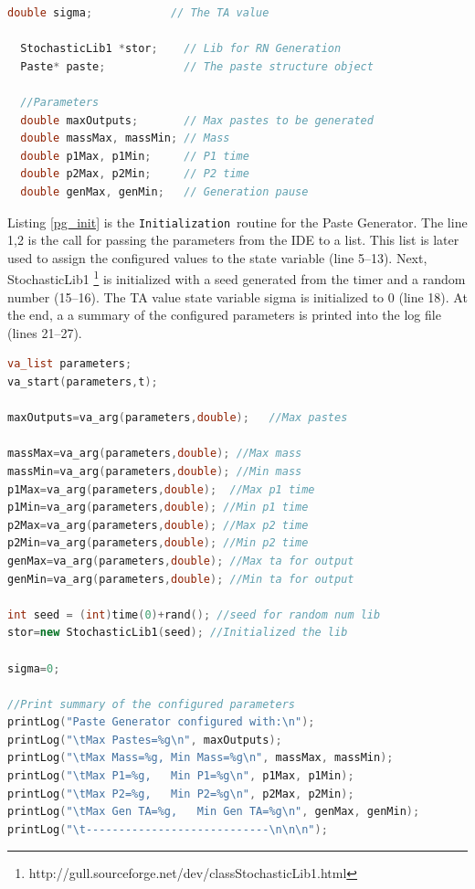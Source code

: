 \documentclass[titlepage]{article}%
\newcommand{\pgen}{\texttt{Paste Generator}~}
\newcommand{\init}{\texttt{Initialization}~}
\begin{document}
{\begin{lstlisting}[caption={State variables and objects}, language=c++, label={pg_state_var}]
  double sigma;            // The TA value

  StochasticLib1 *stor;    // Lib for RN Generation
  Paste* paste;            // The paste structure object

  //Parameters
  double maxOutputs;       // Max pastes to be generated
  double massMax, massMin; // Mass
  double p1Max, p1Min;     // P1 time 
  double p2Max, p2Min;     // P2 time
  double genMax, genMin;   // Generation pause

\end{lstlisting}

Listing \ref{pg_init} is the \init routine for the Paste Generator. The line 1,2 is the call for passing the parameters from the IDE to a list. This list is later used to assign the configured values to the state variable (line 5--13). Next,  StochasticLib1 \footnote{http://gull.sourceforge.net/dev/classStochasticLib1.html} is initialized with a seed generated from the timer and a random number (15--16). The TA value state variable sigma is initialized to 0 (line 18). At the end, a a summary of the configured parameters is printed into the log file (lines 21--27).

\begin{lstlisting}[caption={The \init for the \pgen }, language=c++, label={pg_init}]
va_list parameters;
va_start(parameters,t);

maxOutputs=va_arg(parameters,double);	//Max pastes

massMax=va_arg(parameters,double); //Max mass
massMin=va_arg(parameters,double); //Min mass
p1Max=va_arg(parameters,double);  //Max p1 time
p1Min=va_arg(parameters,double); //Min p1 time
p2Max=va_arg(parameters,double); //Max p2 time
p2Min=va_arg(parameters,double); //Min p2 time
genMax=va_arg(parameters,double); //Max ta for output
genMin=va_arg(parameters,double); //Min ta for output

int seed = (int)time(0)+rand(); //seed for random num lib
stor=new StochasticLib1(seed); //Initialized the lib

sigma=0;												

//Print summary of the configured parameters
printLog("Paste Generator configured with:\n");
printLog("\tMax Pastes=%g\n", maxOutputs);
printLog("\tMax Mass=%g, Min Mass=%g\n", massMax, massMin);
printLog("\tMax P1=%g,   Min P1=%g\n", p1Max, p1Min);
printLog("\tMax P2=%g,   Min P2=%g\n", p2Max, p2Min);
printLog("\tMax Gen TA=%g,   Min Gen TA=%g\n", genMax, genMin);
printLog("\t----------------------------\n\n\n");
\end{lstlisting}	


}
\end{document}
